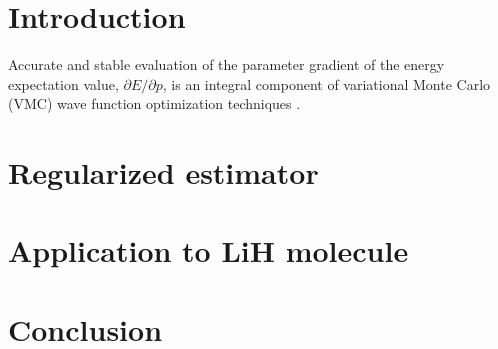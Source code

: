 \documentclass{article}
\begin{document}
\section{Introduction}
Accurate and stable evaluation of the parameter gradient of the energy expectation value, $\partial E/\partial p$, is an integral component of variational Monte Carlo (VMC) wave function optimization techniques \cite{PhysRevB.64.024512, doi:10.1063/1.1604379, Toulouse2007}.

\section{Regularized estimator}
\section{Application to LiH molecule}
\section{Conclusion}


\end{document}
